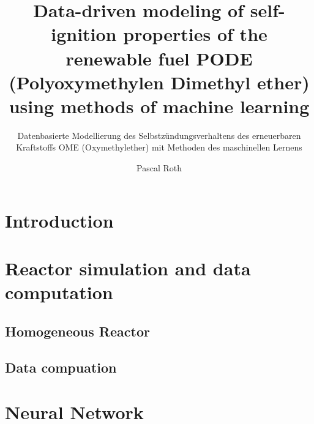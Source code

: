 \documentclass[
	ruledheaders=section,
	class=report,
	thesis={type=bachelor},
	accentcolor=1c,
	custommargins=true,
	marginpar=false,
	parskip=half-,
	fontsize=11pt,
]{tudapub}
\begin{document}

\title{Data-driven modeling of self-ignition properties of the renewable fuel PODE (Polyoxymethylen Dimethyl ether) using methods of machine learning}
\subtitle{Datenbasierte Modellierung des Selbstzündungsverhaltens des erneuerbaren Kraftstoffs OME (Oxymethylether) mit Methoden des maschinellen Lernens}
\author[P. Roth]{Pascal Roth}


\submissiondate{\today}
\examdate{\today}


\maketitle

\affidavit

\tableofcontents


\chapter{Introduction}


\chapter{Reactor simulation and data computation}

\section{Homogeneous Reactor}

\section{Data compuation}

\chapter{Neural Network }
\end{document}
